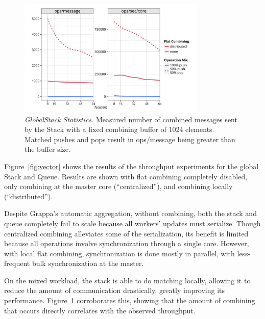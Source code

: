 \begin{figure}[t]
  \centering
  \includegraphics[width=0.8\textwidth]{data/plots/stack_stats.pdf}
  \caption{\emph{GlobalStack Statistics.}
    Measured number of combined messages sent by the Stack with a fixed combining buffer of 1024 elements.
    Matched pushes and pops result in ops/message being greater than the buffer size.
  }
  \label{fig:stack_stats}
\end{figure}

Figure~\ref{fig:vector} shows the results of the throughput experiments for the global Stack and Queue. Results are shown with flat combining completely disabled, only combining at the master core (``centralized''), and combining locally (``distributed'').

Despite Grappa's automatic aggregation, without combining, both the stack and queue completely fail to scale because all workers' updates must serialize.
Though centralized combining alleviates some of the serialization, its benefit is limited 
because all operations involve synchronization through a single core.
However, with local flat combining, synchronization is done mostly in parallel, with less-frequent bulk synchronization at the master.

On the mixed workload, the stack is able to do matching locally, allowing it to reduce the amount of communication drastically, greatly improving its performance. Figure~\ref{fig:stack_stats} corroborates this, showing that the amount of combining that occurs directly correlates with the observed throughput.


